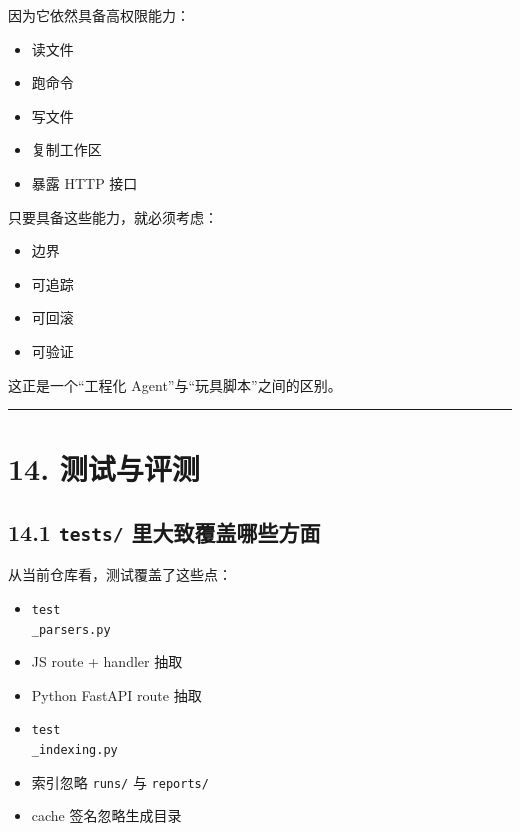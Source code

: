 \documentclass[UTF8,12pt,openany]{ctexbook}
\begin{document}
因为它依然具备高权限能力：\par

\begin{itemize}
\item 读文件
\item 跑命令
\item 写文件
\item 复制工作区
\item 暴露 HTTP 接口
\end{itemize}

只要具备这些能力，就必须考虑：\par

\begin{itemize}
\item 边界
\item 可追踪
\item 可回滚
\item 可验证
\end{itemize}

这正是一个“工程化 Agent”与“玩具脚本”之间的区别。\par

\hrule

\section{14. 测试与评测}

\subsection{14.1 \texttt{tests/} 里大致覆盖哪些方面}

从当前仓库看，测试覆盖了这些点：\par

\begin{itemize}
\item \texttt{test\\_parsers.py}
\item JS route + handler 抽取
\item Python FastAPI route 抽取
\end{itemize}

\begin{itemize}
\item \texttt{test\\_indexing.py}
\item 索引忽略 \texttt{runs/} 与 \texttt{reports/}
\item cache 签名忽略生成目录
\end{itemize}
\end{document}
